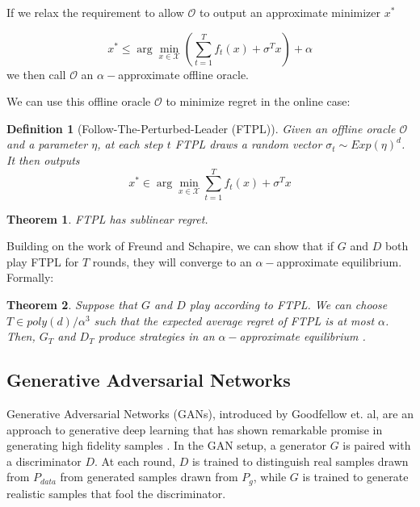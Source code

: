 \documentclass[]{article}
\newcommand{\X}{\mathcal{X}}
\newtheorem{definition}{Definition}[section]
\newtheorem{theorem}{Theorem}[section]
\theoremstyle{definition}
\begin{document}
If we relax the requirement to allow $\mathcal{O}$ to output an approximate minimizer $x^*$

\begin{equation}
    x^* \leq \arg\min_{x \in \X} \left(\sum_{t=1}^Tf_t(x) + \sigma^Tx\right) + \alpha
\end{equation}
we then call $\mathcal{O}$ an $\alpha-$approximate offline oracle.

We can use this offline oracle $\mathcal{O}$ to minimize regret in the online case:

\begin{definition}[Follow-The-Perturbed-Leader (FTPL)]
    Given an offline oracle $\mathcal{O}$ and a parameter $\eta$, at each step $t$ FTPL draws a random vector $\sigma_t \sim Exp(\eta)^d$. It then outputs 
    \begin{equation}
        x^* \in \arg\min_{x \in \X} \sum_{t=1}^Tf_t(x) + \sigma^Tx
    \end{equation}
\end{definition}

\begin{theorem}
    FTPL has sublinear regret. \cite{AGH18}
\end{theorem}

Building on the work of Freund and Schapire, we can show that if $G$ and $D$ both play FTPL for $T$ rounds, they will converge to an $\alpha-$approximate equilibrium. Formally:

\begin{theorem}\label{ftpl-equilibriu}
    Suppose that $G$ and $D$ play according to FTPL. We can choose $T \in poly(d)/\alpha^3$ such that the expected average regret of FTPL is at most $\alpha$. Then, $G_T$ and $D_T$ produce strategies in an $\alpha-$approximate equilibrium \cite{AGH18}.
\end{theorem}


\subsection{Generative Adversarial Networks}

Generative Adversarial Networks (GANs), introduced by Goodfellow et. al, are an approach to generative deep learning that has shown remarkable promise in generating high fidelity samples \cite{GPM+14}. In the GAN setup, a generator $G$ is paired with a discriminator $D$. At each round, $D$ is trained to distinguish real samples drawn from $P_{data}$ from generated samples drawn from $P_g$, while $G$ is trained to generate realistic samples that fool the discriminator. 
\end{document}
